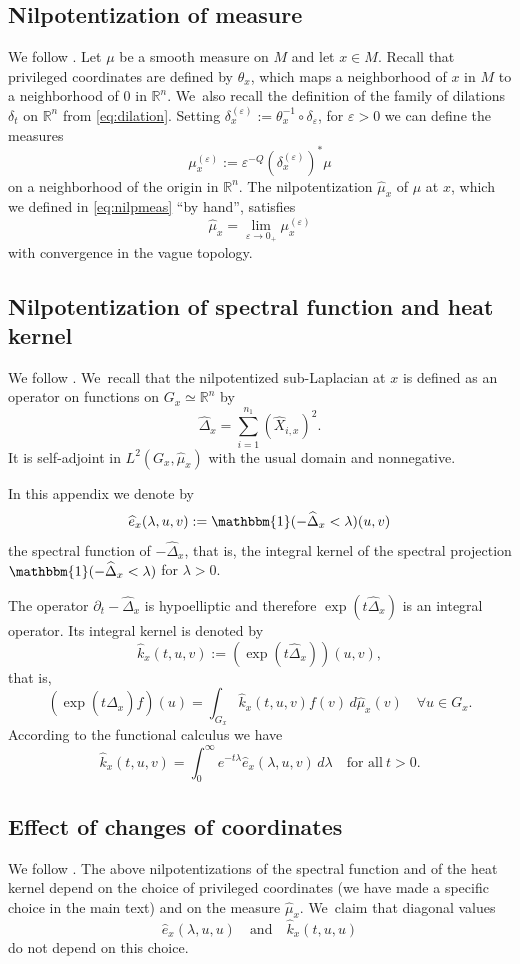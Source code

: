 \documentclass[10pt]{amsart}
\theoremstyle{definition}
\let\epsilon\varepsilon
\newcommand{\1}{\mathbbm{1}}
\newcommand{\R}{\mathbb{R}}
\begin{document}
\subsection{Nilpotentization of measure}
We follow \cite[\S A.5.6]{CHT1}. Let $\mu$ be a smooth measure on $M$ and let $x \in M$. Recall that privileged coordinates are defined by $\theta_x$, which maps a neighborhood of $x$ in $M$ to a neighborhood of $0$ in $\R^n$. We~also recall the definition of the family of dilations $\delta_t$ on $\R^n$ from \eqref{eq:dilation}. Setting $\delta_x^{(\epsilon)} := \theta_x^{-1} \circ \delta_\varepsilon$, for $\varepsilon>0$ we can define the measures
\[
\mu_x^{(\varepsilon)} := \varepsilon^{-Q}(\delta_x^{(\varepsilon)})^*\mu
\]
on a neighborhood of the origin in $\R^n$. The nilpotentization $\widehat\mu_x$ of $\mu$ at $x$, which we defined in \eqref{eq:nilpmeas} ``by hand'', satisfies
\[
\widehat{\mu}_x=\lim_{\varepsilon\to 0_+}\mu_x^{(\epsilon)}
\]
with convergence in the vague topology.

\subsection{Nilpotentization of spectral function and heat kernel}
We follow \cite[\S A.8.3]{CHT1}. We~recall that the nilpotentized sub-Laplacian at $x$ is defined as an operator on functions on $G_x\simeq \R^n$ by
\[
\widehat{\Delta}_x= \sum_{i=1}^{n_1} (\widehat{X}_{i,x})^2.
\]
It is self-adjoint in $L^2(G_x,\widehat\mu_x)$ with the usual domain and nonnegative.

In this appendix we denote by
\[
\widehat e_x(\lambda,u,v) := \1(-\widehat\Delta_x <\lambda)(u,v)
\]
the spectral function of $-\widehat\Delta_x$, that is, the integral kernel of the spectral projection $\1(-\widehat\Delta_x<\lambda)$ for $\lambda>0$.

The operator $\partial_t- \widehat{\Delta}_x$ is hypoelliptic and therefore $\exp (t \widehat \Delta_x)$ is an integral operator. Its integral kernel is denoted by
\[
\widehat k_x(t,u,v) := (\exp(t\widehat\Delta_x))(u,v),
\]
that is,
\[
(\exp(t \widehat \Delta_x) f)(u)= \int_{G_x} \widehat k_x(t,u,v) f(v)\,d \widehat{\mu}_x(v)
\quad \forall u\in G_x.
\]
According to the functional calculus we have
\begin{equation}
\label{eq:heatkernelspecfcn}
\widehat k_x(t,u,v) = \int_0^\infty e^{-t\lambda} \widehat e_x(\lambda,u,v)\,d\lambda
\quad\text{for all}\ t>0.
\end{equation}

\subsection{Effect of changes of coordinates}
We follow \cite[2nd part of App.\,A.8.2]{CHT1}. The above nilpotentizations of the spectral function and of the heat kernel depend on the choice of privileged coordinates (we have made a specific choice in the main text) and on the measure $\widehat\mu_x$. We~claim that diagonal values
\[
\widehat e_x(\lambda,u,u)
\quad\text{and}\quad
\widehat k_x(t,u,u)
\]
do not depend on this choice.
\end{document}
